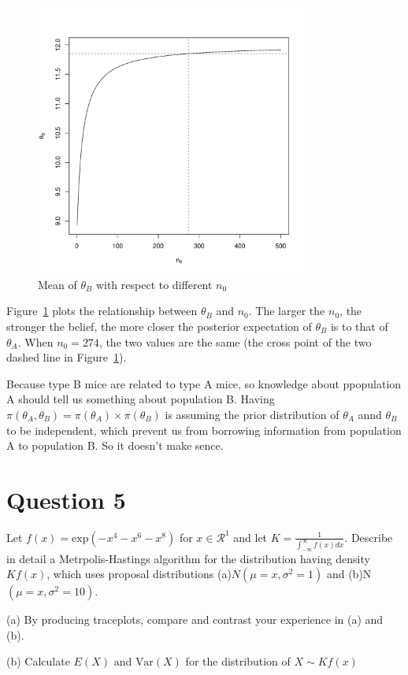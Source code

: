 \documentclass[11pt]{article}
\newcommand{\prob}[1]{
\begin{tcolorbox}[colback=green!5!white,colframe=green!75!black]
#1
\end{tcolorbox}
}
\begin{document}
\begin{figure}[htpb]
	\centering
	\includegraphics[width=0.8\textwidth]{Ast3-Q4-partb.pdf}
	\caption{Mean of $\theta_B$ with respect to different $n_0$}
	\label{fig:Ast3-Q4-partb-pdf}
\end{figure}

Figure~\ref{fig:Ast3-Q4-partb-pdf} plots the relationship between $\theta_B$ and $n_0$. The larger the $n_0$, the stronger the belief, the more closer the posterior expectation of $\theta_B$ is to that of $\theta_A$. When $n_0 = 274$, the two values are the same (the cross point of the two dashed line in Figure~\ref{fig:Ast3-Q4-partb-pdf}).

Because type B mice are related to type A mice, so knowledge about ppopulation A should tell us something about population B. Having $\pi(\theta_A,\theta_B) = \pi(\theta_A) \times \pi(\theta_B)$ is assuming the prior distribution of $\theta_A$ annd $\theta_B$ to be independent, which prevent us from borrowing information from population A to population B. So it doesn't make sence.

\newpage
\section{Question 5}
\prob{
Let $f(x) = \text{exp}(-x^{4}-x^{6}-x^{8})$ for $x \in \mathcal{R}^1$ and let $K = \frac{1}{\int_{-\infty}^{\infty} f(x) dx}$. Describe in detail a Metrpolis-Hastings algorithm for the distribution having density $Kf(x)$, which uses proposal distributions (a)$N (\mu = x, \sigma^2 = 1)$ and (b)N $(\mu = x, \sigma^2 = 10)$.

(a) By producing traceplots, compare and contrast your experience in (a) and (b).

(b) Calculate $E(X)$ and $\text{Var}(X)$ for the distribution of $X \sim Kf(x)$
}
\end{document}
